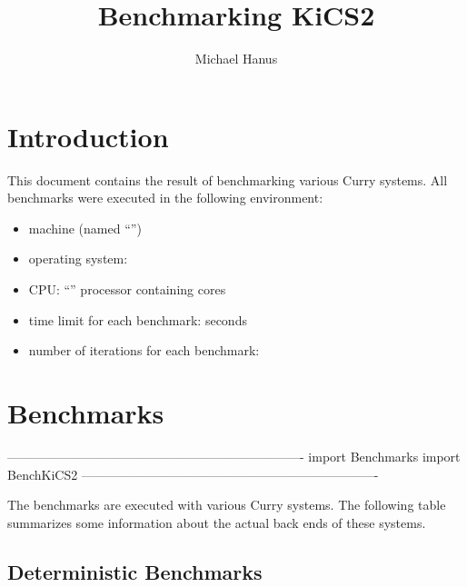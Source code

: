\documentclass{article}
\begin{document}
\sloppy

\title{Benchmarking KiCS2}
\author{Michael Hanus}
\maketitle

\section{Introduction}

This document contains the result of benchmarking various
Curry systems.
%
All benchmarks were executed in the following environment:
\begin{itemize}
\item {} machine (named ``'')
\item operating system:  
\item CPU: ``'' processor containing
       cores
\item time limit for each benchmark:  seconds
\item number of iterations for each benchmark:
\end{itemize}
     
\section{Benchmarks}

\begin{curryprog}
----------------------------------------------------------------------
import Benchmarks
import BenchKiCS2
----------------------------------------------------------------------
\end{curryprog}

The benchmarks are executed with various Curry systems.
The following table summarizes some information about the
actual back ends of these systems.

\begin{center}
\end{center}

\subsection{Deterministic Benchmarks}
\end{document}
